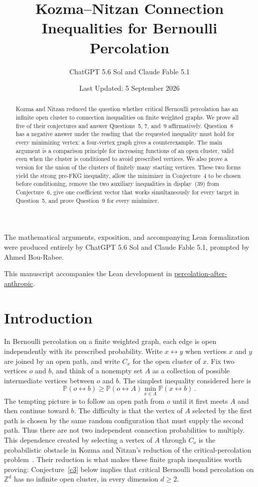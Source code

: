 \documentclass[11pt]{article}
\title{Kozma--Nitzan Connection Inequalities for Bernoulli Percolation}
\author{ChatGPT 5.6 Sol and Claude Fable 5.1}
\date{\small Last Updated: 5 September 2026}
\theoremstyle{definition}
\theoremstyle{remark}
\newcommand{\PP}{\mathbb P}
\newcommand{\con}{\leftrightarrow}
\begin{document}
\maketitle

\begin{center}
\small
The mathematical arguments, exposition, and accompanying Lean formalization were
produced entirely by ChatGPT 5.6 Sol and Claude Fable 5.1, prompted by Ahmed Bou-Rabee.
\par\smallskip
This manuscript accompanies the Lean development in \href{https://github.com/nitromannitol/percolation-after-anthropic}{percolation-after-anthropic}.
\end{center}

\begin{abstract}
Kozma and Nitzan reduced the question whether critical Bernoulli percolation has an
infinite open cluster to connection inequalities on finite weighted graphs. We prove all
five of their conjectures and answer Questions~5, 7, and~9 affirmatively. Question~8 has a
negative answer under the reading that the requested inequality must hold for every
minimizing vertex: a four-vertex graph gives a counterexample. The main argument is a
comparison principle for increasing functions of an open cluster, valid even when the
cluster is conditioned to avoid prescribed vertices. We also prove a version for the
union of the clusters of finitely many starting vertices. These two forms yield the strong
pre-FKG inequality, allow the minimizer in Conjecture~4 to be chosen before conditioning,
remove the two auxiliary inequalities in display~(39) from Conjecture~6, give one
coefficient vector that works simultaneously for every target in Question~5, and prove
Question~9 for every minimizer.
\end{abstract}

\section{Introduction}

In Bernoulli percolation on a finite weighted graph, each edge is open independently with
its prescribed probability. Write $x\con y$ when vertices $x$ and $y$ are joined by an
open path, and write $C_x$ for the open cluster of $x$. Fix two vertices $o$ and $b$, and
think of a nonempty set $A$ as a collection of possible intermediate vertices between
$o$ and $b$. The simplest inequality considered here is
\[
  \PP(o\con b)\geq \PP(o\con A)\min_{x\in A}\PP(x\con b)\,.
\]
The tempting picture is to follow an open path from $o$ until it first meets $A$ and then
continue toward $b$. The difficulty is that the vertex of $A$ selected by the first path is chosen
by the same random configuration that must supply the second path. Thus there are not two
independent connection probabilities to multiply. This dependence created by selecting a
vertex of $A$ through $C_o$ is the probabilistic obstacle in Kozma and Nitzan's reduction
of the critical-percolation problem~\cite{KN}. Their reduction is what makes these finite
graph inequalities worth proving: Conjecture~\ref{c3} below implies that critical Bernoulli
bond percolation on $\mathbb Z^d$ has no infinite open cluster, in every dimension
$d\geq2$.
\end{document}
